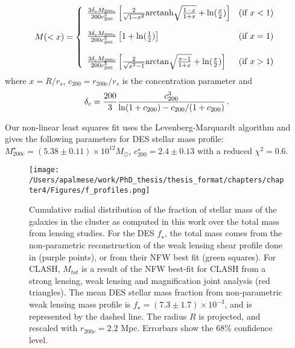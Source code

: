 {\begin{equation}
M(<x) = \left\{ \begin{array}{ll}
\frac{3 \delta_c M_{200c}}{200 c_{200}^3}
\left[\frac{2}{\sqrt{1-x^2}}{\rm arctanh}\sqrt{\frac{1-x}{1+x}}+ {\rm ln}(\frac{x}{2})
 \right] & ({\rm if }\;x < 1)\\
 & \\
\frac{3 \delta_c M_{200c}}{200 c_{200}^3}\left[ 1+{\rm ln}(\frac{1}{2})
 \right]  & ({\rm if }\;x = 1) \\
 & \\
\frac{3 \delta_c M_{200c}}{200 c_{200}^3}\left[\frac{2}{\sqrt{x^2-1}}{\rm arctan}\sqrt{\frac{x-1}{1+x}}+ {\rm ln}(\frac{x}{2}) \right]
& ({\rm if }\;x > 1)\\
\end{array}
\right.\label{2dmass}
\end{equation}
where $x=R/r_{s}$, $c_{200}=r_{200c}/r_s$ is the concentration parameter and 
\begin{equation}
\delta_c=\frac{200}{3}\frac{c_{200}^3}{{\rm ln}(1+c_{200})-c_{200}/(1+c_{200})}\,.
\end{equation}

Our non-linear least squares fit uses the Levenberg-Marquardt algorithm and gives the following parameters for DES stellar mass profile: $M_{200c}^\star= (5.38\pm 0.11)\times 10^{12} M_\odot$, $c_{200}^\star= 2.4  \pm 0.13 $ with a reduced $\chi ^2=0.6$.


\begin{figure}
\centering
\texttt{[image: /Users/apalmese/work/PhD\_thesis/thesis\_format/chapters/chapter4/Figures/f\_profiles.png]}
\caption{Cumulative radial distribution of the fraction of stellar mass of the galaxies in the cluster as computed in this work over the total mass from lensing studies. For the DES $f_\star$, the total mass comes from the non-parametric reconstruction of the weak lensing shear profile done in \citealt{melchior} (purple points), or from their NFW best fit (green squares). For CLASH, $M_{tot}$ is a result of the \citet{umetsu15} NFW best-fit for CLASH from a strong lensing, weak lensing and magnification joint analysis (red triangles). The mean DES stellar mass fraction from non-parametric weak lensing mass profile is $f_\star=(7.3 \pm  1.7)\times10^{-3}$, and is represented by the dashed line. The radius $R$ is projected, and rescaled with $r_{200c}=2.2$ Mpc. Errorbars show the 68\% confidence level.}\label{f_profile}
\end{figure}

}
